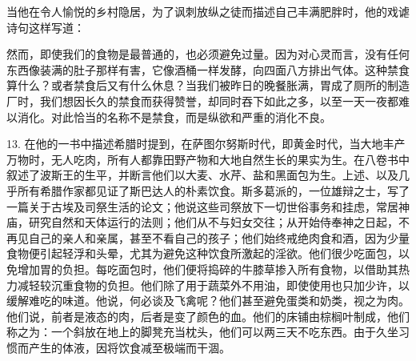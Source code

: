 当他在令人愉悦的乡村隐居，为了讽刺放纵之徒而描述自己丰满肥胖时，他的戏谑诗句这样写道：\par

\par

然而，即使我们的食物是最普通的，也必须避免过量。因为对心灵而言，没有任何东西像装满的肚子那样有害，它像酒桶一样发酵，向四面八方排出气体。这种禁食算什么？或者禁食后又有什么休息？当我们被昨日的晚餐胀满，胃成了厕所的制造厂时，我们想因长久的禁食而获得赞誉，却同时吞下如此之多，以至一天一夜都难以消化。对此恰当的名称不是禁食，而是纵欲和严重的消化不良。\par

13. 在他的一书中描述希腊时提到，在萨图尔努斯时代，即黄金时代，当大地丰产万物时，无人吃肉，所有人都靠田野产物和大地自然生长的果实为生。在八卷书中叙述了波斯王的生平，并断言他们以大麦、水芹、盐和黑面包为生。上述、以及几乎所有希腊作家都见证了斯巴达人的朴素饮食。斯多葛派的，一位雄辩之士，写了一篇关于古埃及司祭生活的论文；他说这些司祭放下一切世俗事务和挂虑，常居神庙，研究自然和天体运行的法则；他们从不与妇女交往；从开始侍奉神之日起，不再见自己的亲人和亲属，甚至不看自己的孩子；他们始终戒绝肉食和酒，因为少量食物便引起轻浮和头晕，尤其为避免这种饮食所激起的淫欲。他们很少吃面包，以免增加胃的负担。每吃面包时，他们便将捣碎的牛膝草掺入所有食物，以借助其热力减轻较沉重食物的负担。他们除了用于蔬菜外不用油，即使使用也只加少许，以缓解难吃的味道。他说，何必谈及飞禽呢？他们甚至避免蛋类和奶类，视之为肉。他们说，前者是液态的肉，后者是变了颜色的血。他们的床铺由棕榈叶制成，他们称之为：一个斜放在地上的脚凳充当枕头，他们可以两三天不吃东西。由于久坐习惯而产生的体液，因将饮食减至极端而干涸。\par

